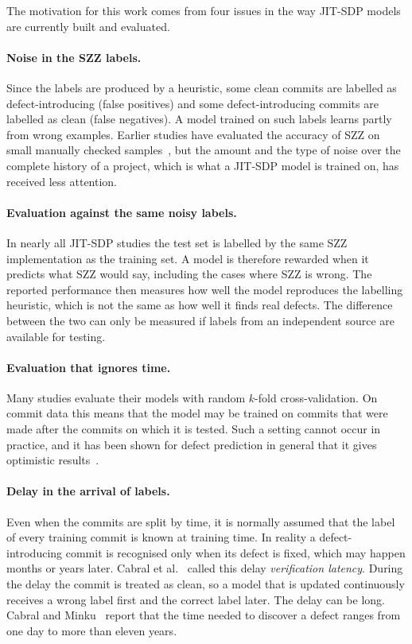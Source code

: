\documentclass[12pt,a4paper,oneside]{report}
\begin{document}
The motivation for this work comes from four issues in the way JIT-SDP models
are currently built and evaluated.

\paragraph{Noise in the SZZ labels.} Since the labels are produced by a
heuristic, some clean commits are labelled as defect-introducing (false
positives) and some defect-introducing commits are labelled as clean (false
negatives). A model trained on such labels learns partly from wrong examples.
Earlier studies have evaluated the accuracy of SZZ on small manually checked
samples~\cite{dacosta2017maszz,rosa2021oracle}, but the amount and the
type of noise over the complete history of a project, which is what a JIT-SDP
model is trained on, has received less attention.

\paragraph{Evaluation against the same noisy labels.} In nearly all JIT-SDP
studies the test set is labelled by the same SZZ implementation as the
training set. A model is therefore rewarded when it predicts what SZZ would
say, including the cases where SZZ is wrong. The reported performance then
measures how well the model reproduces the labelling heuristic, which is not
the same as how well it finds real defects. The difference between the two can
only be measured if labels from an independent source are available for
testing.

\paragraph{Evaluation that ignores time.} Many studies evaluate their models
with random $k$-fold cross-validation. On commit data this means that the
model may be trained on commits that were made after the commits on which it
is tested. Such a setting cannot occur in practice, and it has been shown for
defect prediction in general that it gives optimistic
results~\cite{falessi2020order,tan2015online}.

\paragraph{Delay in the arrival of labels.} Even when the commits are split
by time, it is normally assumed that the label of every training commit is
known at training time. In reality a defect-introducing commit is recognised
only when its defect is fixed, which may happen months or years later. Cabral
et al.~\cite{cabral2019orb} called this delay \emph{verification latency}.
During the delay the commit is treated as clean, so a model that is updated
continuously receives a wrong label first and the correct label later. The
delay can be long. Cabral and Minku~\cite{cabral2023reliable} report that the
time needed to discover a defect ranges from one day to more than eleven
years.
\end{document}
